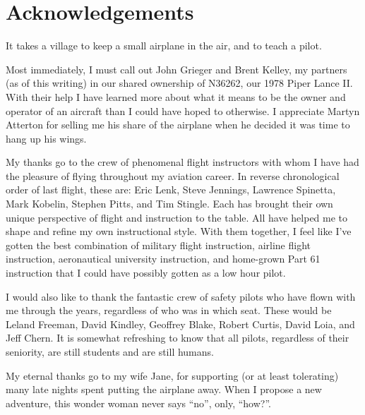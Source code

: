 \section*{Acknowledgements}

It takes a village to keep a small airplane in the air, and to teach a pilot.

Most immediately, I must call out John Grieger and Brent Kelley, my partners (as of this writing) in our shared ownership of N36262, our 1978 Piper Lance II. With their help I have learned more about what it means to be the owner and operator of an aircraft than I could have hoped to otherwise. I appreciate Martyn Atterton for selling me his share of the airplane when he decided it was time to hang up his wings.

My thanks go to the crew of phenomenal flight instructors with whom I have had the pleasure of flying throughout my aviation career. In reverse chronological order of last flight, these are: Eric Lenk, Steve Jennings, Lawrence Spinetta, Mark Kobelin, Stephen Pitts, and Tim Stingle. Each has brought their own unique perspective of flight and instruction to the table. All have helped me to shape and refine my own instructional style. With them together, I feel like I've gotten the best combination of military flight instruction, airline flight instruction, aeronautical university instruction, and home-grown Part 61 instruction that I could have possibly gotten as a low hour pilot.

I would also like to thank the fantastic crew of safety pilots who have flown with me through the years, regardless of who was in which seat. These would be Leland Freeman, David Kindley, Geoffrey Blake, Robert Curtis, David Loia, and Jeff Chern. It is somewhat refreshing to know that all pilots, regardless of their seniority, are still students and are still humans.

My eternal thanks go to my wife Jane, for supporting (or at least tolerating) many late nights spent putting the airplane away. When I propose a new adventure, this wonder woman never says ``no'', only, ``how?''.


